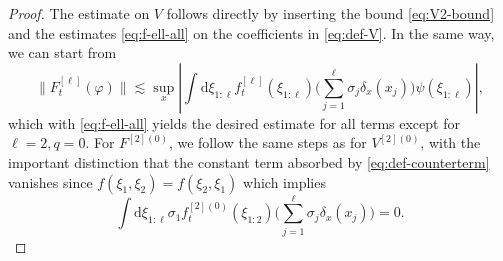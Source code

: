 \documentclass[11pt, a4paper]{scrartcl}
\numberwithin{equation}{section}
\theoremstyle{plain}
\theoremstyle{remark}
\newcommand{\mathd}{\mathrm{d}}
\begin{document}
\begin{proof}
	The estimate on $V$ follows directly by inserting the bound \eqref{eq:V2-bound} and the estimates \eqref{eq:f-ell-all} on the coefficients in \eqref{eq:def-V}.
	In the same way, we can start from
	\[\|F^{[\ell]}_t(\varphi)\|\lesssim \sup_x| \int \mathd \xi_{1:\ell} f^{[\ell]}_t(\xi_{1:\ell})\big(\sum_{j=1}^{\ell}\sigma_j\delta_x(x_j)\big) \psi(\xi_{1:\ell})|,\]
	which with \eqref{eq:f-ell-all} yields the desired estimate for all terms except for $\ell=2,q=0$. For $F^{[2](0)}$, we follow the same steps as for $V^{[2](0)}$, with the important distinction that the constant term
	absorbed by \eqref{eq:def-counterterm} vanishes since $f(\xi_1,\xi_2)=f(\xi_2,\xi_1)$ which implies
	\[\int \mathd \xi_{1:\ell} \sigma_1 f_t^{[2](0)}(\xi_{1:2})\big(\sum_{j=1}^{\ell}\sigma_j\delta_x(x_j)\big)=0.\]
\end{proof}
\end{document}
